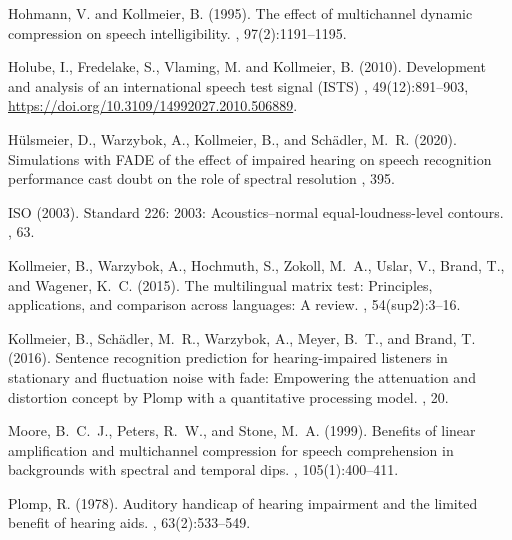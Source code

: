 \documentclass[10pt,a4paper,twocolumn]{article}
\begin{document}
\begin{thebibliography}{}
	Hohmann, V. and Kollmeier, B. (1995).
	\newblock The effect of multichannel dynamic compression on speech intelligibility.
	, 97(2):1191--1195.
	
	Holube, I., Fredelake, S., Vlaming, M. and Kollmeier, B. (2010).
	\newblock Development and analysis of an international speech test signal (ISTS)
	, 49(12):891--903, \url{https://doi.org/10.3109/14992027.2010.506889}.
	
    Hülsmeier, D., Warzybok, A., Kollmeier, B., and Schädler, M.~R. (2020).
	\newblock Simulations with FADE of the effect of impaired hearing on speech recognition performance cast doubt on the role of spectral resolution
	, 395.
	
	ISO (2003).
	\newblock Standard 226: 2003: Acoustics--normal equal-loudness-level contours.
	, 63.
	
	Kollmeier, B., Warzybok, A., Hochmuth, S., Zokoll, M.~A., Uslar, V., Brand, T., and Wagener, K.~C. (2015).
	\newblock The multilingual matrix test: Principles, applications, and
	comparison across languages: A review.
	, 54(sup2):3--16.
	
	Kollmeier, B., Schädler, M.~R., Warzybok, A., Meyer, B.~T., and Brand, T.
	(2016).
	\newblock Sentence recognition prediction for hearing-impaired listeners in
	stationary and fluctuation noise with fade: Empowering the attenuation and
	distortion concept by Plomp with a quantitative processing model.
	, 20.

	Moore, B.~C.~J., Peters, R.~W., and Stone, M.~A. (1999).
	\newblock Benefits of linear amplification and multichannel compression for speech comprehension in backgrounds with spectral and temporal dips.
	, 105(1):400--411.
	
	Plomp, R. (1978).
	\newblock Auditory handicap of hearing impairment and the limited benefit of hearing aids.
	, 63(2):533--549.


\end{thebibliography}
\end{document}
